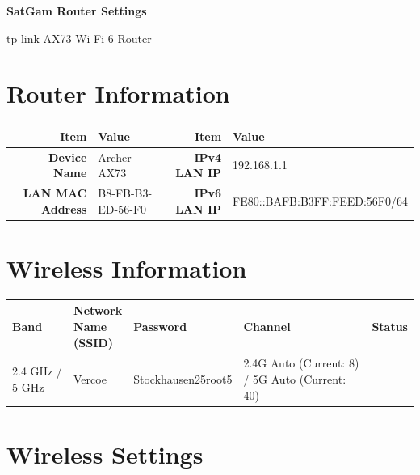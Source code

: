\documentclass[10pt,a4paper]{article}
\newcommand{\checkbox}{%
  \raisebox{0.1ex}{\fbox{\rule{0pt}{1.05ex}\rule{1.05ex}{0pt}}}%
}
\begin{document}
{\centering
  {\Large\bfseries SatGam Router Settings\par}
  \vspace{2mm}
  {\normalsize tp-link AX73 Wi-Fi 6 Router\par}
}

\vspace{3mm}

\section*{Router Information}

\begin{tabularx}{\textwidth}{@{} R V R V @{}}
\toprule
{}
\textbf{Item} & \textbf{Value} & \textbf{Item} & \textbf{Value} \\
\midrule
\textbf{Device Name} & Archer AX73 & \textbf{IPv4 LAN IP} & 192.168.1.1 \\
\textbf{LAN MAC Address} & B8-FB-B3-ED-56-F0 & \textbf{IPv6 LAN IP} & FE80::BAFB:B3FF:\newline FEED:56F0/64 \\
\bottomrule
\end{tabularx}

\vspace{7mm}

\section*{Wireless Information}

\begin{tabularx}{\textwidth}{@{} p{} p{} p{} X p{} @{}}
\toprule
\rowcolor{gray!18}
\textbf{Band} & \shortstack[l]{\textbf{Network}\\\textbf{Name}\\\textbf{(SSID)}} & \textbf{Password} & \textbf{Channel} & \textbf{Status} \\
\midrule
2.4 GHz / 5 GHz & Vercoe & Stockhausen25root5 & 2.4G Auto (Current: 8) / 5G Auto (Current: 40) & \checkbox{} \\
\bottomrule
\end{tabularx}

\vspace{7mm}

\section*{Wireless Settings}
\end{document}
